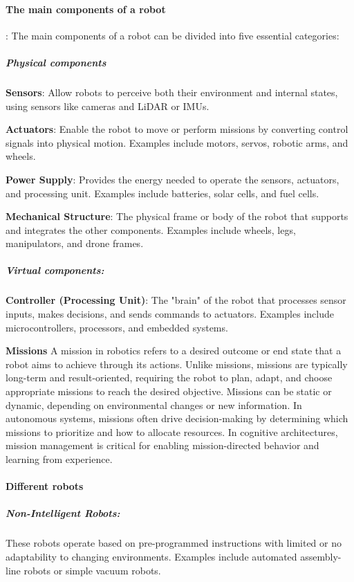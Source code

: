 \documentclass{book}
\begin{document}
\paragraph{The main components of a robot}:
The main components of a robot can be divided into five essential categories:

    \subparagraph{Physical components}
        \textbf{Sensors}: Allow robots to perceive both their environment and internal states, using sensors like cameras and LiDAR or IMUs.

        \textbf{Actuators}: Enable the robot to move or perform missions by converting control signals into physical motion.
        Examples include motors, servos, robotic arms, and wheels.

        \textbf{Power Supply}: Provides the energy needed to operate the sensors, actuators, and processing unit.
        Examples include batteries, solar cells, and fuel cells.

        \textbf{Mechanical Structure}: The physical frame or body of the robot that supports and integrates the other components.
        Examples include wheels, legs, manipulators, and drone frames.

    \subparagraph{Virtual components:}
        \textbf{Controller (Processing Unit)}: The "brain" of the robot that processes sensor inputs, makes decisions, and sends commands to actuators.
        Examples include microcontrollers, processors, and embedded systems.

        \textbf{Missions} A mission in robotics refers to a desired outcome or end state that a robot aims to achieve through its actions. Unlike missions, missions are typically long-term and result-oriented, requiring the robot to plan, adapt, and choose appropriate missions to reach the desired objective. Missions can be static or dynamic, depending on environmental changes or new information. In autonomous systems, missions often drive decision-making by determining which missions to prioritize and how to allocate resources. In cognitive architectures, mission management is critical for enabling mission-directed behavior and learning from experience.
        




\paragraph{Different robots}

    \subparagraph{Non-Intelligent Robots:} These robots operate based on pre-programmed instructions with limited or no adaptability to changing environments. Examples include automated assembly-line robots or simple vacuum robots. 
\end{document}
